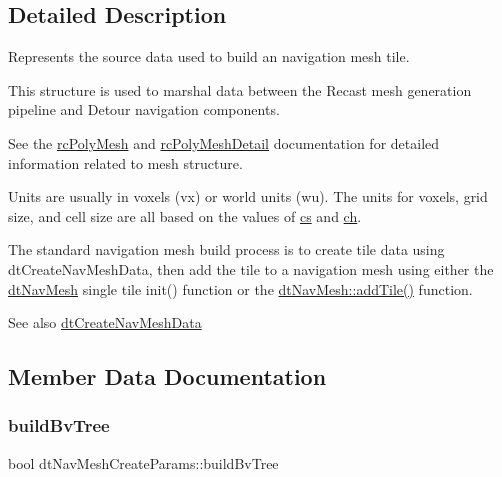 \subsection{Detailed Description}
Represents the source data used to build an navigation mesh tile.

\begin{DoxyParagraph}{}

\end{DoxyParagraph}
This structure is used to marshal data between the Recast mesh generation pipeline and Detour navigation components.

See the \hyperlink{structrcPolyMesh}{rc\+Poly\+Mesh} and \hyperlink{structrcPolyMeshDetail}{rc\+Poly\+Mesh\+Detail} documentation for detailed information related to mesh structure.

Units are usually in voxels (vx) or world units (wu). The units for voxels, grid size, and cell size are all based on the values of \hyperlink{structdtNavMeshCreateParams_a2297125898dd39b19c515638d31cacfc}{cs} and \hyperlink{structdtNavMeshCreateParams_aabc87cedcd783bdd16b8b4377fdb8ccf}{ch}.

The standard navigation mesh build process is to create tile data using dt\+Create\+Nav\+Mesh\+Data, then add the tile to a navigation mesh using either the \hyperlink{classdtNavMesh}{dt\+Nav\+Mesh} single tile {\ttfamily init()} function or the \hyperlink{classdtNavMesh_a5b5a7c4fa72c08d9a6d4cc4d8cd3bb89}{dt\+Nav\+Mesh\+::add\+Tile()} function.

\begin{DoxySeeAlso}{See also}
\hyperlink{group__detour_gaf56ac19e79e5948fdb1051158577e648}{dt\+Create\+Nav\+Mesh\+Data} 
\end{DoxySeeAlso}


\subsection{Member Data Documentation}
\mbox{\label{structdtNavMeshCreateParams_a3c0dab8176f42294bd87c07a4fcce519}} 
\subsubsection{\texorpdfstring{build\+Bv\+Tree}{buildBvTree}}
{\footnotesize\ttfamily bool dt\+Nav\+Mesh\+Create\+Params\+::build\+Bv\+Tree}

